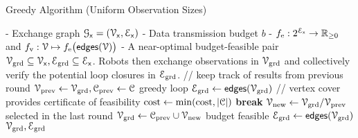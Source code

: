 
\begin{algorithm}[t]
  \caption{Greedy Algorithm (Uniform Observation Sizes)}\label{alg:vgreedy}
  \begin{algorithmic}[1]
	\renewcommand{\algorithmicrequire}{\textbf{Input:}}
	\renewcommand{\algorithmicensure}{\textbf{Output:}}
	\Require
	  \Statex - Exchange graph $\mathcal{G}_\mathsf{x} = (\mathcal{V}_\mathsf{x}, \mathcal{E}_\mathsf{x})$
	  \Statex - Data transmission budget $b$ 
	  \Statex - $f_\text{e}: 2^{\mathcal{E}_\mathsf{x}} \to \mathbb{R}_{\geq 0}$ and 
	  $f_\text{v} : \mathcal{V} \mapsto
	    f_\text{e}\big(\mathsf{edges}(\mathcal{V})\big)$
	\Ensure
	\Statex - A near-optimal budget-feasible pair 
	$\mathcal{V}_\text{grd} \subseteq \mathcal{V}_\mathsf{x}, \mathcal{E}_\text{grd} \subseteq \mathcal{E}_\mathsf{x}$. 
	Robots then exchange observations in $\mathcal{V}_\text{grd}$ and collectively verify the potential loop closures in $\mathcal{E}_\text{grd}$.
	\vspace{0.08cm}
	\State \textcolor{green!50!black}{// keep track of results from previous round}
	\State $\mathcal{V}_\text{prev} \leftarrow \mathcal{V}_\text{grd}, \mathcal{C}_\text{prev} \leftarrow \mathcal{C}$
	 \Comment \textcolor{green!50!black}{greedy loop}
		\EndWhile
		\State $\mathcal{E}_\text{grd} \leftarrow \mathsf{edges}(\mathcal{V}_\text{grd})$ 
		\State \textcolor{green!50!black}{// vertex cover provides certificate of feasibility}
		\footnotemark \label{line:vcover1} 
		\State $\text{cost} \leftarrow \min(\text{cost}, |\mathcal{C}| )$
		\State \textbf{break}
		\EndIf
	\EndWhile
	\State $\mathcal{V}_\text{new} \leftarrow \mathcal{V}_\text{grd}/\mathcal{V}_\text{prev}$ \Comment \textcolor{green!50!black}{selected in the last round}
	\State $\mathcal{V}_\text{grd} \leftarrow \mathcal{C}_\text{prev} \cup \mathcal{V}_\text{new}$ \Comment \textcolor{green!50!black}{budget feasible}
	\State $\mathcal{E}_\text{grd} \leftarrow \mathsf{edges}(\mathcal{V}_\text{grd})$ 
	\State \Return $\mathcal{V}_\text{grd}, \mathcal{E}_\text{grd}$
	\EndFunction
  \end{algorithmic}
\end{algorithm}


